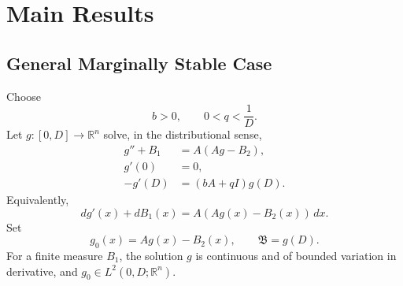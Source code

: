 \documentclass[journal]{IEEEtran}
\newcommand{\R}{\mathbb R}
\newcommand{\Bcal}{\mathfrak B}
\begin{document}
\section{Main Results}

\subsection{General Marginally Stable Case}

Choose
\begin{equation}
 b>0,
 \qquad 0<q<\frac{1}{D}.\label{eq:bq_design}
\end{equation}
Let $g:[0,D]\to\R^n$ solve, in the distributional sense,
\begin{align}
 g''+B_1&=A(Ag-B_2),\label{eq:g_bvp_general}\\
 g'(0)&=0,\label{eq:g_left}\\
 -g'(D)&=(bA+qI)g(D).\label{eq:g_right}
\end{align}
Equivalently,
\begin{equation}
 dg'(x)+dB_1(x)=A(Ag(x)-B_2(x))\,dx.
\end{equation}
Set
\begin{equation}
 g_0(x)=Ag(x)-B_2(x),
 \qquad \Bcal=g(D).\label{eq:g0_B_general}
\end{equation}
For a finite measure $B_1$, the solution $g$ is continuous and of bounded variation in derivative, and $g_0\in L^2(0,D;\R^n)$.
\end{document}
